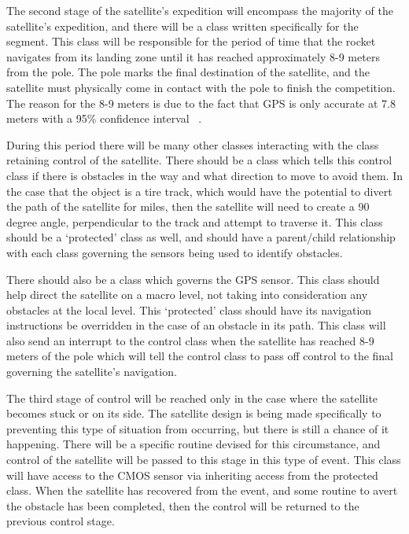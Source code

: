 \documentclass[10pt,letterpaper,onecolumn,journal]{IEEEtran}
\begin{document}
\par
The second stage of the satellite's expedition will encompass the majority of the satellite's expedition, and there will be a class written specifically for the segment. This class will be responsible for the period of time that the rocket navigates from its landing zone until it has reached approximately 8-9 meters from the pole. The pole marks the final destination of the satellite, and the satellite must physically come in contact with the pole to finish the competition. The reason for the 8-9 meters is due to the fact that GPS is only accurate at 7.8 meters with a 95\% confidence interval ~\cite{gov2016}.\vspace{.3cm}
\par
During this period there will be many other classes interacting with the class retaining control of the satellite. There should be a class which tells this control class if there is obstacles in the way and what direction to move to avoid them. In the case that the object is a tire track, which would have the potential to divert the path of the satellite for miles, then the satellite will need to create a 90 degree angle, perpendicular to the track and attempt to traverse it. This class should be a ‘protected’ class as well, and should have a parent/child relationship with each class governing the sensors being used to identify obstacles.\vspace{.3cm}
\par 
There should also be a class which governs the GPS sensor. This class should help direct the satellite on a macro level, not taking into consideration any obstacles at the local level. This ‘protected’ class should have its navigation instructions be overridden in the case of an obstacle in its path. This class will also send an interrupt to the control class when the satellite has reached 8-9 meters of the pole which will tell the control class to pass off control to the final governing the satellite's navigation.\vspace{.3cm}
\par
The third stage of control will be reached only in the case where the satellite becomes stuck or on its side. The satellite design is being made specifically to preventing this type of situation from occurring, but there is still a chance of it happening. There will be a specific routine devised for this circumstance, and control of the satellite will be passed to this stage in this type of event. This class will have access to the CMOS sensor via inheriting access from the protected class. When the satellite has recovered from the event, and some routine to avert the obstacle has been completed, then the control will be returned to the previous control stage.\vspace{.3cm}
\end{document}
